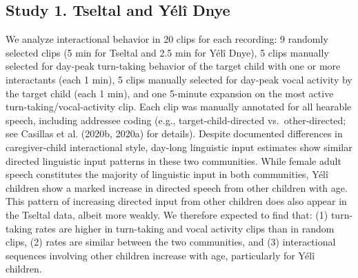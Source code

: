 \documentclass[10pt, letterpaper]{article}
\begin{document}
\hypertarget{study-1.-tseltal-and-yuxe9luxee-dnye}{%
\subsection{Study 1. Tseltal and Yélî
Dnye}\label{study-1.-tseltal-and-yuxe9luxee-dnye}}

We analyze interactional behavior in 20 clips for each recording: 9
randomly selected clips (5 min for Tseltal and 2.5 min for Yélî Dnye), 5
clips manually selected for day-peak turn-taking behavior of the target
child with one or more interactants (each 1 min), 5 clips manually
selected for day-peak vocal activity by the target child (each 1 min),
and one 5-minute expansion on the most active turn-taking/vocal-activity
clip. Each clip was manually annotated for all hearable speech,
including addressee coding (e.g., target-child-directed
vs.~other-directed; see Casillas et al. (2020b, 2020a) for details).
Despite documented differences in caregiver-child interactional style,
day-long linguistic input estimates show similar directed linguistic
input patterns in these two communities. While female adult speech
constitutes the majority of linguistic input in both communities, Yélî
children show a marked increase in directed speech from other children
with age. This pattern of increasing directed input from other children
does also appear in the Tseltal data, albeit more weakly. We therefore
expected to find that: (1) turn-taking rates are higher in turn-taking
and vocal activity clips than in random clips, (2) rates are similar
between the two communities, and (3) interactional sequences involving
other children increase with age, particularly for Yélî children.
\end{document}
